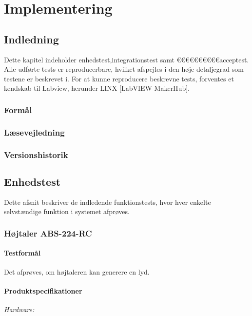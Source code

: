 \chapter{Implementering}

\section{Indledning}
	Dette kapitel indeholder enhedstest,integrationstest samt €€€€€€€€€€acceptest. Alle udførte tests er reproducerbare, hvilket afspejles i den høje detaljegrad som testene er beskrevet i. For at kunne reproducere beskrevne tests, forventes et kendskab til Labview, herunder LINX [LabVIEW MakerHub]. 
	
	    	  
		\subsection{Formål}
	
		\subsection{Læsevejledning}	
	
		
		\subsection{Versionshistorik}

 
\section{Enhedstest}
	Dette afsnit beskriver de indledende funktionstests, hvor hver enkelte selvstændige funktion i systemet afprøves. 
	
	\subsection{Højtaler ABS-224-RC}
	\label{etha}
		\subsubsection{Testformål}
		Det afprøves, om højtaleren kan generere en lyd.
		\subsubsection{Produktspecifikationer}
	
	
		\textit{Hardware:}\\
		\\
		\hojtalerkabel\\
		\pins\\
		\arduino\\
		\PC\\
		\usbkabel\\
	
